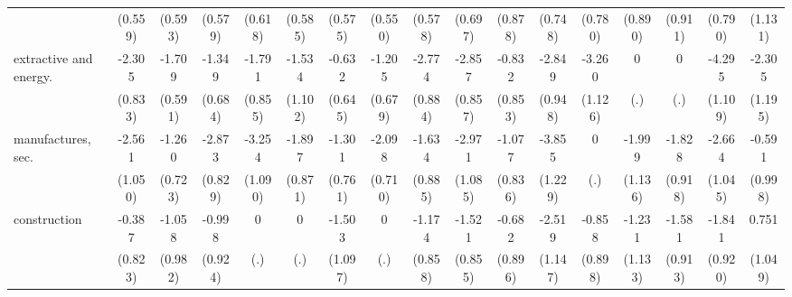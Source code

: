 {\begin{tabular}{l*{16}{c}}
                    &     (0.559)         &     (0.593)         &     (0.579)         &     (0.618)         &     (0.585)         &     (0.575)         &     (0.550)         &     (0.578)         &     (0.697)         &     (0.878)         &     (0.748)         &     (0.780)         &     (0.890)         &     (0.911)         &     (0.790)         &     (1.131)         \\
[1em]
extractive and energy.&      -2.305\sym{**} &      -1.709\sym{**} &      -1.349\sym{*}  &      -1.791\sym{*}  &      -1.534         &      -0.632         &      -1.205         &      -2.774\sym{**} &      -2.857\sym{***}&      -0.832         &      -2.849\sym{**} &      -3.260\sym{**} &           0         &           0         &      -4.295\sym{***}&      -2.305         \\
                    &     (0.833)         &     (0.591)         &     (0.684)         &     (0.855)         &     (1.102)         &     (0.645)         &     (0.679)         &     (0.884)         &     (0.857)         &     (0.853)         &     (0.948)         &     (1.126)         &         (.)         &         (.)         &     (1.109)         &     (1.195)         \\
[1em]
manufactures, sec.  &      -2.561\sym{*}  &      -1.260         &      -2.873\sym{***}&      -3.254\sym{**} &      -1.897\sym{*}  &      -1.301         &      -2.098\sym{**} &      -1.634         &      -2.971\sym{**} &      -1.077         &      -3.855\sym{**} &           0         &      -1.999         &      -1.828\sym{*}  &      -2.664\sym{*}  &      -0.591         \\
                    &     (1.050)         &     (0.723)         &     (0.829)         &     (1.090)         &     (0.871)         &     (0.761)         &     (0.710)         &     (0.885)         &     (1.085)         &     (0.836)         &     (1.229)         &         (.)         &     (1.136)         &     (0.918)         &     (1.045)         &     (0.998)         \\
[1em]
construction        &      -0.387         &      -1.058         &      -0.998         &           0         &           0         &      -1.503         &           0         &      -1.174         &      -1.521         &      -0.682         &      -2.519\sym{*}  &      -0.858         &      -1.231         &      -1.581         &      -1.841\sym{*}  &       0.751         \\
                    &     (0.823)         &     (0.982)         &     (0.924)         &         (.)         &         (.)         &     (1.097)         &         (.)         &     (0.858)         &     (0.855)         &     (0.896)         &     (1.147)         &     (0.898)         &     (1.133)         &     (0.913)         &     (0.920)         &     (1.049)         \\

\end{tabular}}
